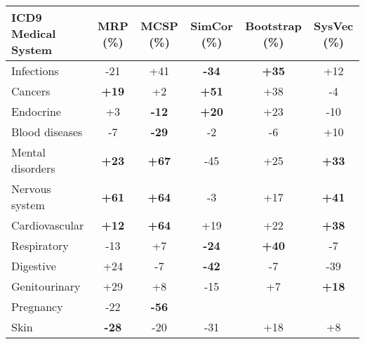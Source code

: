 \documentclass[11pt,a4paper]{article}
\def\blu#1{{\textbf{\color{blu}#1}}}
\def\ora#1{{\textbf{\color{ora}#1}}}
\begin{document}
\begin{table*}[h]
	\begin{center}
	\label{tab:allsystemresults}
	\begin{tabular}{l|c|c|c|c|c}
		ICD9 Medical System& MRP (\%)                           & MCSP (\%)                         & SimCor (\%)                        & Bootstrap (\%)                    & SysVec (\%)                     \\
		\hline
		Infections           & -21                       & +41                         & \blu{-34} & \ora{+35} & +12                        \\
		Cancers              & \ora{+19}  & +2                         & \ora{+51}  & +38                        & -4                        \\
		Endocrine            & +3                         & \blu{-12} & \ora{+20}  & +23                        & -10                         \\
		Blood diseases       & -7                        & \blu{-29} & -2                         & -6                       & +10                        \\
		Mental disorders     & \ora{+23}   & \ora{+67}  & -45                        & +25                         & \ora{+33} \\
		Nervous system       & \ora{+61}   & \ora{+64}  & -3                        & +17                        & \ora{+41} \\
		Cardiovascular       & \ora{+12}  & \ora{+64}  & +19                         & +22                        & \ora{+38} \\
		Respiratory          & -13                         & +7                         & \blu{-24} & \ora{+40} & -7                        \\
		Digestive            & +24                         & -7                        & \blu{-42} & -7                       & -39                       \\
		Genitourinary        & +29                         & +8                          & -15                        & +7                        & \ora{+18} \\
		Pregnancy            & -22                        & \blu{-56}  &                               &                              &                              \\
		Skin                 & \blu{-28} & -20                        & -31                        & +18                         & +8                        \\

\end{tabular}
\end{center}
\end{table*}
\end{document}
